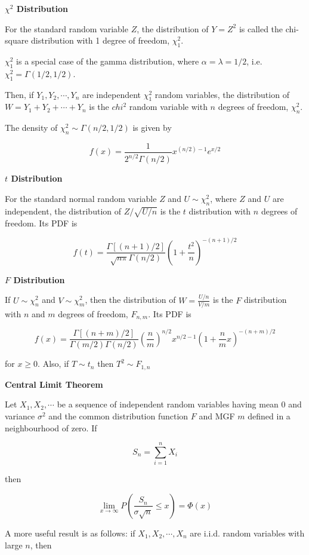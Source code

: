 \documentclass[a4paper]{article}
\newcommand{\subheading}[1]{{\scriptsize\textbf{#1}}}
\begin{document}
\begin{multicols*}{4}
\subheading{$\chi^2$ Distribution}

For the standard random variable $Z$, the distribution of $Y = Z^2$ is called
the chi-square distribution with 1 degree of freedom, $\chi^2_1$. \smallskip

$\chi^2_1$ is a special case of the gamma distribution, where $\alpha = \lambda
= 1/2$, i.e. $\chi^2_1 = \Gamma(1/2, 1/2)$. \smallskip

Then, if $Y_1, Y_2, \cdots, Y_n$ are independent $\chi^2_1$ random variables,
the distribution of $W = Y_1 + Y_2 + \cdots + Y_n$ is the $chi^2$ random
variable with $n$ degrees of freedom, $\chi^2_n$. \smallskip

The density of $\chi^2_n \sim \Gamma(n/2, 1/2)$ is given by

$$f(x) = \frac{1}{2^{n/2} \Gamma(n/2)} x^{(n/2) - 1} e^{x/2}$$

\subheading{$t$ Distribution}

For the standard normal random variable $Z$ and $U \sim \chi^2_n$, where $Z$ and
$U$ are independent, the distribution of $Z / \sqrt{U/n}$ is the $t$
distribution with $n$ degrees of freedom. Its PDF is

$$f(t) = \frac{\Gamma[(n+1)/2]}{\sqrt{n\pi}\Gamma(n/2)}
  \left ( 1 + \frac{t^2}{n} \right )^{-(n+1)/2} $$

\subheading{$F$ Distribution}

If $U \sim \chi^2_n$ and $V \sim \chi^2_m$, then the distribution of $W =
\frac{U/n}{V/m}$ is the $F$ distribution with $n$ and $m$ degrees of freedom,
$F_{n, m}$. Its PDF is

{\tiny
$$f(x) = \frac{\Gamma[(n+m)/2]}{\Gamma(m/2)\Gamma(n/2)}
  \left ( \frac{n}{m} \right )^{n/2}
  x^{n/2 -1}
  \left (1 + \frac{n}{m}x \right )^{-(n+m)/2}$$
}

for $x \geq 0$. Also, if $T \sim t_n$ then $T^2 \sim F_{1,n}$ \smallskip

\subheading{Central Limit Theorem}

Let $X_1, X_2, \cdots$ be a sequence of independent random variables having mean
0 and variance $\sigma^2$ and the common distribution function $F$ and MGF $m$
defined in a neighbourhood of zero. If

$$S_n = \sum^n_{i=1} X_i$$

then

$$\lim_{x\rightarrow \infty}
  P \left ( \frac{S_n}{\sigma \sqrt{n}} \leq x \right )
  = \Phi(x)$$

A more useful result is as follows: if $X_1, X_2, \cdots, X_n$ are i.i.d. random
variables with large $n$, then


\end{multicols*}
\end{document}
